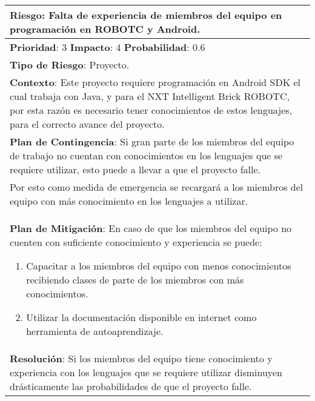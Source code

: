 \begin{table}[H]
  \centering
  \begin{tabular}{|p{15cm}|}\hline
    {\bf Riesgo}: Falta de experiencia de miembros del equipo en programación en ROBOTC y Android.\\\hline
    {\bf Prioridad}: 3  {\bf Impacto}: 4  {\bf Probabilidad}: 0.6\\\hline
    {\bf Tipo de Riesgo}: Proyecto.\\\hline
    {\bf Contexto}: Este proyecto requiere programación en Android SDK el cual trabaja con Java, y para el NXT Intelligent Brick ROBOTC, por esta razón es necesario tener conocimientos de estos lenguajes, para el correcto avance del proyecto.\\\hline
    {\bf Plan de Contingencia}: Si gran parte de los miembros del equipo de trabajo no cuentan con conocimientos en los lenguajes que se requiere utilizar, esto puede a llevar a que el proyecto falle.\\Por esto como medida de emergencia se recargará a los miembros del equipo con más conocimiento en los lenguajes a utilizar.\\\hline
    {\bf Plan de Mitigación}: En caso de que los miembros del equipo no cuenten con suficiente conocimiento y experiencia se puede:\begin{enumerate}\item Capacitar a los miembros del equipo con menos conocimientos recibiendo clases de parte de los miembros con más conocimientos.\item Utilizar la documentación disponible en internet como herramienta de autoaprendizaje.\end{enumerate}\\\hline
    {\bf Resolución}: Si los miembros del equipo tiene conocimiento y experiencia con los lenguajes que se requiere utilizar disminuyen drásticamente las probabilidades de que el proyecto falle.\\\hline
  \end{tabular}
  \label{table:R5}
\end{table}



